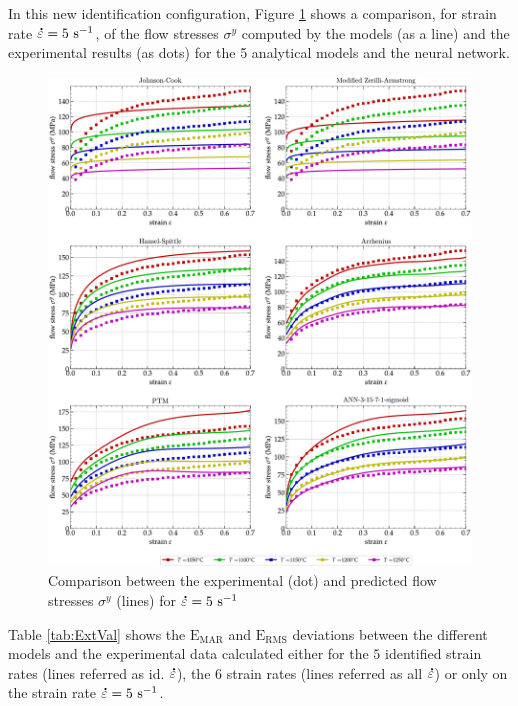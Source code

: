 \documentclass[metals,article,submit,pdftex,moreauthors]{Definitions/mdpi}
\DeclareRobustCommand{\mdot}[1]{\accentset{\mbox{\bfseries .}}{#1}}
\DeclareRobustCommand{\RMSE}{\text{E}_\text{RMS}}
\DeclareRobustCommand{\MARE}{\text{E}_\text{MAR}}
\DeclareRobustCommand{\ps}{\text{s}^{-1}}
\begin{document}
In this new identification configuration, Figure \ref{fig:CompExt} shows a comparison, for strain rate $\mdot\varepsilon=5~\ps$, of the flow stresses $\sigma^y$ computed by the models (as a line) and the experimental results (as dots) for the 5 analytical models and the neural network.
\begin{figure}[!ht]
\centering
\includegraphics[width=\columnwidth]
{Figures/CompExt}
\caption{Comparison between the experimental (dot) and predicted flow stresses $\sigma^y$ (lines) for $\mdot\varepsilon=5~\ps$}
\label{fig:CompExt}
\end{figure}
Table \ref{tab:ExtVal} shows the $\MARE$ and $\RMSE$ deviations between the different models and the experimental data calculated either for the $5$ identified strain rates (lines referred as id. $\mdot\varepsilon$), the $6$ strain rates (lines referred as all $\mdot\varepsilon$) or only on the strain rate $\mdot\varepsilon=5~\ps$.
\end{document}
